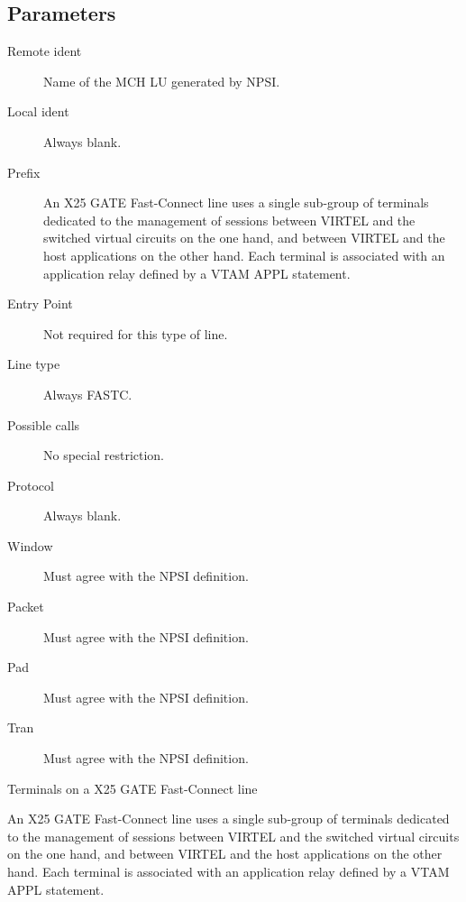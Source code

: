 \documentclass[letterpaper,10pt,english]{sphinxmanual}
\begin{document}
\subsection{Parameters}
\label{\detokenize{connectivity_guide:index-69}}\label{\detokenize{connectivity_guide:id31}}\begin{description}
\item[{Remote ident}] \leavevmode
Name of the MCH LU generated by NPSI.

\item[{Local ident}] \leavevmode
Always blank.

\item[{Prefix}] \leavevmode
An X25 GATE Fast-Connect line uses a single sub-group of terminals dedicated to the management of sessions between VIRTEL and the switched virtual circuits on the one hand, and between VIRTEL and the host applications on the other hand. Each terminal is associated with an application relay defined by a VTAM APPL statement.

\item[{Entry Point}] \leavevmode
Not required for this type of line.

\item[{Line type}] \leavevmode
Always FASTC.

\item[{Possible calls}] \leavevmode
No special restriction.

\item[{Protocol}] \leavevmode
Always blank.

\item[{Window}] \leavevmode
Must agree with the NPSI definition.

\item[{Packet}] \leavevmode
Must agree with the NPSI definition.

\item[{Pad}] \leavevmode
Must agree with the NPSI definition.

\item[{Tran}] \leavevmode
Must agree with the NPSI definition.

\end{description}

Terminals on a X25 GATE Fast-Connect line

An X25 GATE Fast-Connect line uses a single sub-group of terminals dedicated to the management of sessions between VIRTEL and the switched virtual circuits on the one hand, and between VIRTEL and the host applications on the other hand. Each terminal is associated with an application relay defined by a VTAM APPL statement.
\end{document}

